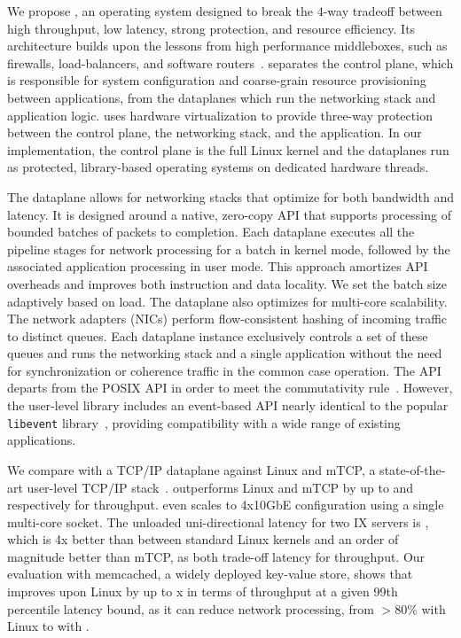 We propose \ix, an operating system designed to break the $4$-way
tradeoff between high throughput, low latency, strong protection, and
resource efficiency. Its architecture builds upon the lessons from
high performance middleboxes, such as firewalls, load-balancers, and
software routers~\cite{routebricks,click}. \ix separates the control
plane, which is responsible for system configuration and coarse-grain
resource provisioning between applications, from the dataplanes which
run the networking stack and application logic. \ix uses hardware
virtualization %
to provide three-way protection between the control plane, the
networking stack, and the application. In our implementation, the
control plane is the full Linux kernel and the dataplanes run as
protected, library-based operating systems on dedicated hardware
threads.

The \ix dataplane allows for networking stacks that optimize for both
bandwidth and latency. It is designed around a native, zero-copy API
that supports processing of bounded batches of packets to
completion. Each dataplane executes all the pipeline stages for
network processing for a batch in kernel mode, followed by the
associated application processing in user mode. This approach
amortizes API overheads and improves both instruction and data
locality. We set the batch size adaptively based on load. The \ix
dataplane also optimizes for multi-core scalability.  The network
adapters (NICs) perform flow-consistent hashing of incoming traffic to
distinct queues. Each dataplane instance exclusively controls a set of
these queues and runs the networking stack and a single application
without the need for synchronization or coherence traffic in the
common case operation. The \ix API departs from the POSIX API in order
to meet the commutativity rule~\cite{DBLP:conf/sosp/ClementsKZMK13}.
However, the \ix user-level library includes an event-based API nearly
identical to the popular \texttt{libevent}
library~\cite{provos2003libevent}, providing compatibility with a wide
range of existing applications.

We compare \ix with a TCP/IP dataplane against Linux
 and mTCP, a state-of-the-art user-level TCP/IP
stack~\cite{jeong2014mtcp}.  \ix outperforms Linux and mTCP by up to
 and  respectively for throughput. \ix
even scales to 4x10GbE configuration using a single multi-core socket.
The unloaded uni-directional latency for two IX servers is
\microsecond, which is 4x better than between standard
Linux kernels and an order of magnitude better than mTCP, as both
trade-off latency for throughput.  Our evaluation with memcached, a
widely deployed key-value store, shows that \ix improves upon Linux by
up to x in terms of throughput at a given 99th
percentile latency bound, as it can reduce  network processing, from $>80\%$ with Linux to
 with \ix.

